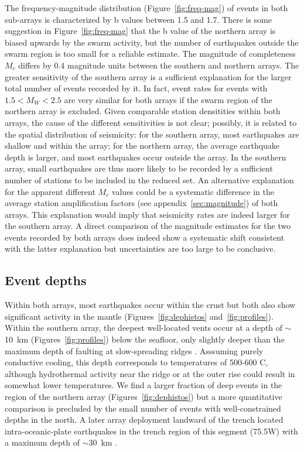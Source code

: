 \documentclass[reviewcopy]{elsarticle}
\begin{document}
The frequency-magnitude distribution (Figure~\ref{fig:freq-mag}) of
events in both sub-arrays is
characterized by b values between 1.5 and 1.7.
There is
some suggestion in Figure~\ref{fig:freq-mag} that the b value of the northern array is biased upwards by
the swarm activity, but the number of earthquakes outside the swarm
region is too small for a reliable estimate.
The magnitude of completeness $M_c$ differs by 0.4 magnitude units between
the southern and northern arrays.
The greater sensitivity of the southern array
 is a sufficient  explanation for the larger total number of events
recorded by it.
  In fact, event rates for events with $1.5<M_W<2.5$
are very similar for both arrays if the swarm region of the northern array is
excluded.   Given comparable station densitities within both arrays,
the cause of the different sensitivities is not clear; possibly, it
is related to the spatial distribution of seismicity: for the
southern array, most earthquakes are shallow and within the array;
for the northern array, the average earthquake depth is larger, and
most earthquakes occur outside the array. In the southern array, small
earthquakes are thus more likely to be recorded by a sufficient number
of stations to be included in the reduced set.
An alternative explanation for the apparent different $M_c$ values
could be a systematic difference in the average station
amplification factors (see appendix~\ref{sec:magnitude}) of both
arrays. This explanation would imply that seismicity rates are indeed
larger for the southern array.  A direct comparison of the magnitude
estimates for the two events recorded by both arrays does indeed show
a systematic shift consistent with the latter explanation but
uncertainties are too large to be conclusive.

\subsection{Event depths}

Within both arrays, most earthquakes occur within the crust but both
also show significant activity in the mantle
(Figures~\ref{fig:dephistos} and~\ref{fig:profiles}). Within the southern array, the deepest
well-located vents occur at a depth of
$\sim$10~km (Figures~\ref{fig:profiles}) below the seafloor, only slightly deeper than the
maximum depth of faulting at slow-spreading ridges
\citep[e.g.][]{toomey88,tilmann04}.  Asssuming purely conductive
cooling, this depth corresponds to temperatures of 500-600\dg
C, although hydrothermal activity  near the ridge or at the outer rise
could result in somewhat lower
 temperatures.  We find a
larger fraction of deep events in the region of the northern array
(Figures~\ref{fig:dephistos}) but
a more quantitative comparison is precluded by the small number of
events with well-constrained depths in the north. A later array
deployment landward of the trench located intra-oceanic-plate
earthquakes in the trench region of this segment (75.5\dg W) with a maximum depth of
$\sim$30~km \citep{lange07}.
\end{document}
